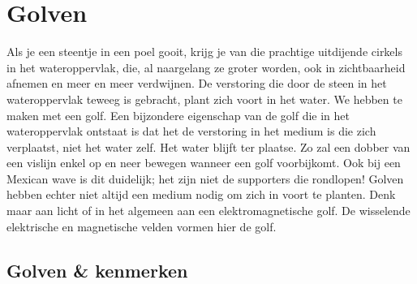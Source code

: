 

\chapter{Golven}

Als je een steentje in een poel gooit, krijg je van die prachtige uitdijende cirkels in het wateroppervlak, die, al naargelang ze groter worden, ook in zichtbaarheid afnemen en meer en meer verdwijnen. De verstoring die door de steen in het wateroppervlak teweeg is gebracht, plant zich voort in het water. We hebben te maken met een golf.
\newline
Een bijzondere eigenschap van de golf die in het wateroppervlak ontstaat is dat het de verstoring in het medium is die zich verplaatst, niet het water zelf. Het water blijft ter plaatse. Zo zal een dobber van een vislijn enkel op en neer bewegen wanneer een golf voorbijkomt. Ook bij een Mexican wave is dit duidelijk; het zijn niet de supporters die rondlopen!
\newline
Golven hebben echter niet altijd een medium nodig om zich in voort te planten. Denk maar aan licht of in het algemeen aan een elektromagnetische golf. De wisselende elektrische en magnetische velden vormen hier de golf.



\section{Golven \& kenmerken}


